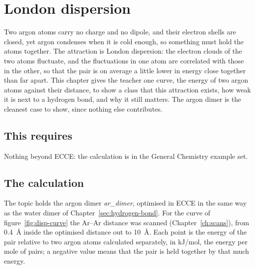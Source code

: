\chapter{London dispersion}
\label{ch:t-dispersion}

Two argon atoms carry no charge and no dipole, and their electron shells are closed, yet argon condenses when it is cold enough, so something must hold the atoms together. The attraction is London dispersion: the electron clouds of the two atoms fluctuate, and the fluctuations in one atom are correlated with those in the other, so that the pair is on average a little lower in energy close together than far apart. This chapter gives the teacher one curve, the energy of two argon atoms against their distance, to show a class that this attraction exists, how weak it is next to a hydrogen bond, and why it still matters. The argon dimer is the cleanest case to show, since nothing else contributes.

\section*{This requires}
Nothing beyond ECCE: the calculation is in the General Chemistry example set.

\section{The calculation}
The topic  holds the argon dimer \emph{ar\_dimer}, optimised in ECCE in the same way as the water dimer of Chapter~\ref{sec:hydrogen-bond}. For the curve of figure~\ref{fig:disp-curve} the Ar--Ar distance was scanned (Chapter~\ref{ch:scans}), from \SI{0.4}{\angstrom} inside the optimised distance out to \SI{10}{\angstrom}. Each point is the energy of the pair relative to two argon atoms calculated separately, in kJ/mol, the energy per mole of pairs; a negative value means that the pair is held together by that much energy.

